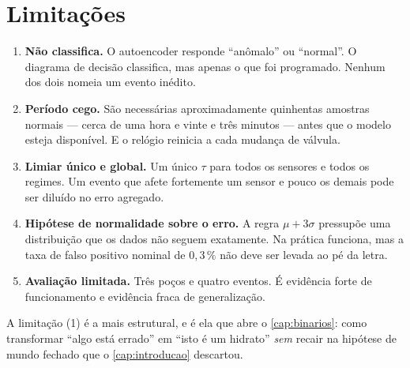 \section{Limitações}

\begin{enumerate}[leftmargin=*,itemsep=0.4em]

\item \textbf{Não classifica.} O autoencoder responde ``anômalo'' ou ``normal''. O
diagrama de decisão classifica, mas apenas o que foi programado. Nenhum dos dois nomeia
um evento inédito.

\item \textbf{Período cego.} São necessárias aproximadamente quinhentas amostras normais
--- cerca de uma hora e vinte e três minutos --- antes que o modelo esteja disponível. E
o relógio reinicia a cada mudança de válvula.

\item \textbf{Limiar único e global.} Um único $\tau$ para todos os sensores e todos os
regimes. Um evento que afete fortemente um sensor e pouco os demais pode ser diluído no
erro agregado.

\item \textbf{Hipótese de normalidade sobre o erro.} A regra $\mu + 3\sigma$ pressupõe
uma distribuição que os dados não seguem exatamente. Na prática funciona, mas a taxa de
falso positivo nominal de $0{,}3\,\%$ não deve ser levada ao pé da letra.

\item \textbf{Avaliação limitada.} Três poços e quatro eventos. É evidência forte de
funcionamento e evidência fraca de generalização.

\end{enumerate}

\begin{destaque}
A limitação (1) é a mais estrutural, e é ela que abre o \cref{cap:binarios}: como
transformar ``algo está errado'' em ``isto é um hidrato'' \emph{sem} recair na hipótese
de mundo fechado que o \cref{cap:introducao} descartou.
\end{destaque}

